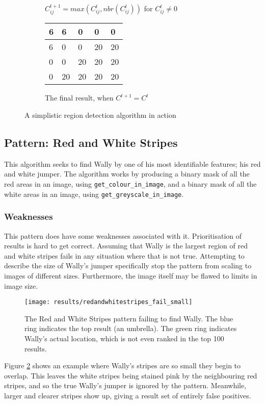 \documentclass[../main.tex]{subfiles}
\begin{document}
\begin{figure}[h]
\begin{subfigure}[b]{0.45\textwidth}
\begin{tabular}{|p{1em}|p{1em}|p{1em}|p{1em}|p{1em}|}
        \end{tabular}
        \caption{$C^{t+1}_{ij}=max\left(C^t_{ij},nbr(C^t_{ij})\right)$ for $C^t_{ij} \neq 0$}
      \end{subfigure}
      \begin{subfigure}[b]{0.45\textwidth}
        \centering
        \begin{tabular}{|p{1em}|p{1em}|p{1em}|p{1em}|p{1em}|}
          \hline
          6&6&0&0&0\\ \hline
          6&0&0&20&20\\ \hline
          0&0&20&20&20\\ \hline
          0&20&20&20&20\\  \hline
        \end{tabular}
        \caption{The final result, when $C^{t+1} = C^t$}
      \end{subfigure}
      \caption{A simplistic region detection algorithm in action}
      \label{simpleregion}
    \end{figure}
  \subsection{Pattern: Red and White Stripes}
    This algorithm seeks to find Wally by one of his most identifiable features; his red and white jumper.
    The algorithm works by producing a binary mask of all the red areas in an image, using \texttt{get\_colour\_in\_image}, and a binary mask of all the white areas in an image, using \texttt{get\_greyscale\_in\_image}.
    \subsubsection{Weaknesses}
      This pattern does have some weaknesses associated with it.
      Prioritisation of results is hard to get correct.
      Assuming that Wally is the largest region of red and white stripes fails in any situation where that is not true.
      Attempting to describe the size of Wally's jumper specifically stop the pattern from scaling to images of different sizes.
      Furthermore, the image itself may be flawed to limits in image size.
      \begin{figure}[h]
        \centering
        \texttt{[image: results/redandwhitestripes\_fail\_small]}
        \caption{
          The Red and White Stripes pattern failing to find Wally.
          The blue ring indicates the top result (an umbrella).
          The green ring indicates Wally's actual location, which is not even ranked in the top 100 results.
        }
        \label{rws_fail_small}
      \end{figure}
      Figure \ref{rws_fail_small} shows an example where Wally's stripes are so small they begin to overlap.
      This leaves the white stripes being stained pink by the neighbouring red stripes, and so the true Wally's jumper is ignored by the pattern.
      Meanwhile, larger and clearer stripes show up, giving a result set of entirely false positives.
\end{document}
